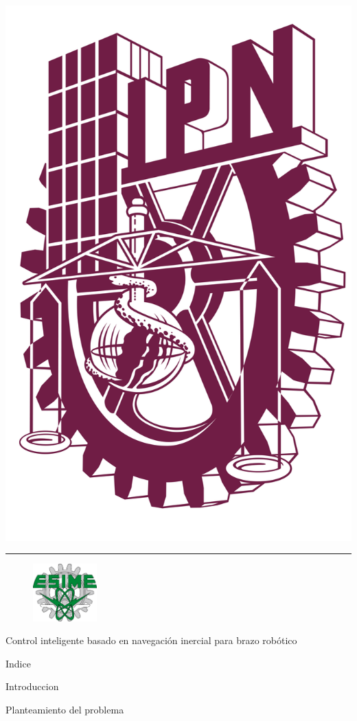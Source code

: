 \documentclass[12pt]{memoir}
\begin{document}
\thispagestyle{empty}


\begin{minipage}{0.2\textwidth}
    \includegraphics[width=\textwidth]{recursos/logo-ipn-guinda.png}
    \hspace{-\textwidth} %
    \vspace{-\topskip}   %
\end{minipage}%
\begin{minipage}{0.2\textwidth}
    \vspace{1.5cm} %
    \noindent\rule{10cm}{0.5pt}
\end{minipage}%

\begin{figure}[b]
\includegraphics[width=0.22\textwidth]{recursos/esime.png}
\end{figure} 

\begin{center}
Control inteligente basado en navegación inercial para brazo robótico
\end{center}

\newpage
Indice

\newpage
Introduccion

\newpage
Planteamiento del problema
\end{document}
